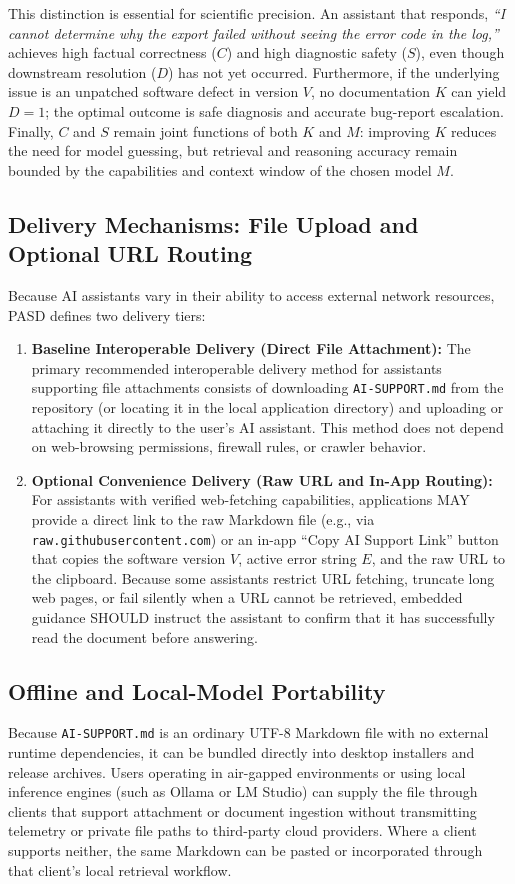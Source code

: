 \documentclass[12pt, a4paper]{article}
\begin{document}
This distinction is essential for scientific precision. An assistant that responds, \textit{``I cannot determine why the export failed without seeing the error code in the log,''} achieves high factual correctness ($C$) and high diagnostic safety ($S$), even though downstream resolution ($D$) has not yet occurred. Furthermore, if the underlying issue is an unpatched software defect in version $V$, no documentation $K$ can yield $D = 1$; the optimal outcome is safe diagnosis and accurate bug-report escalation. Finally, $C$ and $S$ remain joint functions of both $K$ and $M$: improving $K$ reduces the need for model guessing, but retrieval and reasoning accuracy remain bounded by the capabilities and context window of the chosen model $M$.

\subsection{Delivery Mechanisms: File Upload and Optional URL Routing}
Because AI assistants vary in their ability to access external network resources, PASD defines two delivery tiers:

\begin{enumerate}
    \item \textbf{Baseline Interoperable Delivery (Direct File Attachment):} The primary recommended interoperable delivery method for assistants supporting file attachments consists of downloading \texttt{AI-SUPPORT.md} from the repository (or locating it in the local application directory) and uploading or attaching it directly to the user's AI assistant. This method does not depend on web-browsing permissions, firewall rules, or crawler behavior.
    \item \textbf{Optional Convenience Delivery (Raw URL and In-App Routing):} For assistants with verified web-fetching capabilities, applications MAY provide a direct link to the raw Markdown file (e.g., via \texttt{raw.githubusercontent.com}) or an in-app ``Copy AI Support Link'' button that copies the software version $V$, active error string $E$, and the raw URL to the clipboard. Because some assistants restrict URL fetching, truncate long web pages, or fail silently when a URL cannot be retrieved, embedded guidance SHOULD instruct the assistant to confirm that it has successfully read the document before answering.
\end{enumerate}

\subsection{Offline and Local-Model Portability}
Because \texttt{AI-SUPPORT.md} is an ordinary UTF-8 Markdown file with no external runtime dependencies, it can be bundled directly into desktop installers and release archives. Users operating in air-gapped environments or using local inference engines (such as Ollama or LM Studio) can supply the file through clients that support attachment or document ingestion without transmitting telemetry or private file paths to third-party cloud providers. Where a client supports neither, the same Markdown can be pasted or incorporated through that client's local retrieval workflow.
\end{document}
